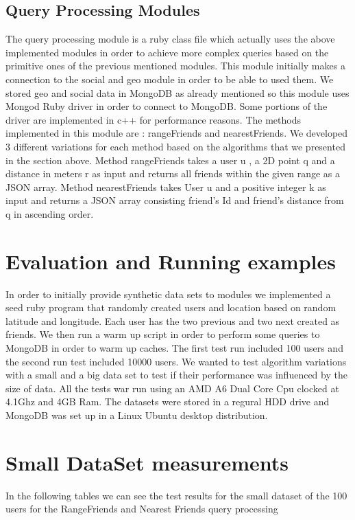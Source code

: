 \documentclass[prodmode,acmtods]{acmsmall} %
\begin{document}
\subsection{Query Processing Modules}
The query processing module is a ruby class file which actually uses the above implemented modules in order to achieve more complex queries based on the primitive ones of the previous mentioned modules.
This module initially makes a connection to the social and geo module in order to be able to used them. We stored geo and social data in MongoDB as already mentioned so this module uses Mongod Ruby driver in order to connect to MongoDB. Some portions of the driver are implemented in c++ for performance reasons. The methods implemented in this module are : rangeFriends and nearestFriends. We developed 3 different variations for each method based on the algorithms that we presented in the section above.
Method rangeFriends takes a user u , a 2D point q and a distance in meters r as input and returns all friends within the given range as a JSON array.
Method nearestFriends takes User u and a positive integer k as input and returns a JSON array consisting friend's Id and friend's distance from q in ascending order.



\section{Evaluation and Running examples}
In order to initially provide synthetic data sets to modules we implemented a seed ruby program that randomly created users and location based on random latitude and longitude. Each user has the two previous and two next created as friends. We then run a warm up script in order to perform some queries to MongoDB in order to warm up caches. The first test run included 100 users and the second run test included 10000 users. We wanted to test algorithm variations with a small and a big data set to test if their performance was influenced by the size of data. All the tests war run using an AMD A6 Dual Core Cpu clocked at 4.1Ghz and 4GB Ram. The datasets were stored in a regural HDD drive and MongoDB was set up in a Linux Ubuntu desktop distribution.

\section{Small DataSet measurements}
In the following tables we can see the test results for the small dataset of the 100 users
for the RangeFriends and Nearest Friends query processing
\newline
\end{document}
